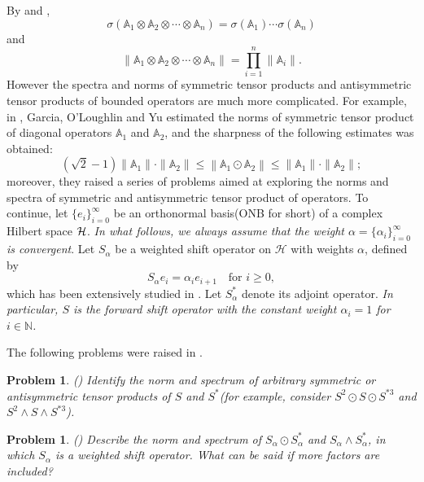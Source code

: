 \documentclass[11pt]{article}
\theoremstyle{plain}
\newtheorem{prob}[thm]{Problem}
\theoremstyle{definition}
\begin{document}
By \cite[Page 162]{BP} and \cite[(3.8.17)]{BSI}, $$\sigma(\mathbb{A}_1\otimes \mathbb{A}_2\otimes\cdots\otimes\mathbb A_n)=\sigma(\mathbb{A}_1)\cdots\sigma(\mathbb{A}_n)$$
 and
$$
\|\mathbb{A}_1\otimes \mathbb{A}_2\otimes\cdots\otimes\mathbb A_n\|=\prod\limits_{i=1}^n \|\mathbb A_i\|.
$$
However the spectra and norms of symmetric tensor products and antisymmetric tensor products of bounded operators are much more complicated. For example, in \cite[Proposition 7.2]{GA}, Garcia, O'Loughlin and Yu estimated the norms of symmetric tensor product of diagonal operators $\mathbb A_1$ and $\mathbb A_2$, and the sharpness of the following estimates was obtained: 
$$
(\sqrt{2}-1)\|\mathbb A_1\|\cdot\|\mathbb A_2\|\leq\left\|\mathbb A_1\odot \mathbb A_2\right\|\leq\|\mathbb A_1\|\cdot\|\mathbb A_2\|;
$$
moreover, they raised a series of problems aimed at exploring the norms and spectra of symmetric and antisymmetric tensor product of operators. To continue, let $\{e_i\}_{i=0}^\infty$ be an orthonormal basis(ONB for short) of a complex Hilbert space $\cal H$.
 {\it In what follows, we always assume that the weight  $\alpha=\{\alpha_i\}_{i=0}^\infty$ is  convergent}. 
Let \( S_{\alpha} \) be a weighted shift operator on \(\mathcal{H}\) with weights \(\alpha\), defined by 
    \[
    S_{\alpha} e_{i} = \alpha_{i} e_{i+1} \quad \text{for } i \ge 0,
    \]
    which has been extensively studied in \cite{Shields}. Let \( S_{\alpha}^{*} \) denote its adjoint operator.  \emph{In particular, \( S \) is the forward shift operator with the constant weight \(\alpha_i = 1\) for \( i \in \mathbb{N} \).}
    
    The following problems were raised in \cite{GA}.


\begin{prob}\label{prob1}(\cite[Problem 6]{GA})
	Identify the norm and spectrum of arbitrary symmetric or antisymmetric tensor products of $S$ and $S^{*}$(for example, consider $S^2 \odot S \odot S^{*3} $ and $S^2 \wedge S \wedge S^{*3} $).
\end{prob}
\begin{prob}\label{prob2}(\cite[Problem 7]{GA})
	Describe the norm and spectrum of $S_{\alpha } \odot S_{\alpha }^{*}$ and $S_{\alpha } \wedge S_{\alpha }^{*}$, in which $S_{\alpha }$ is a weighted shift operator. What can be said if more factors are included?
\end{prob}
\end{document}
